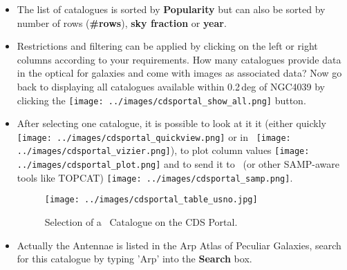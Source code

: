 \documentclass [a4paper, 12pt]{article}
\begin{document}
\begin{itemize}
\item The list of catalogues is sorted by \textbf{Popularity} but can
also be sorted by number of rows (\textbf{\#rows}), \textbf{sky
fraction} or \textbf{year}.
\item Restrictions and filtering can be applied by clicking
on the left or right columns according to your requirements. How many catalogues
provide data in the optical for galaxies and come with images as associated data?
Now go back to displaying all catalogues available within 0.2\,deg of NGC4039 by
clicking the
\texttt{[image: ../images/cdsportal\_show\_all.png]} button.
\item After selecting one catalogue, it is possible to look at it it (either
quickly \texttt{[image: ../images/cdsportal\_quickview.png]}
or in \vizier\ \texttt{[image: ../images/cdsportal\_vizier.png]}),
to plot column values \texttt{[image: ../images/cdsportal\_plot.png]}
and to send it to \aladin\ (or other SAMP-aware tools like TOPCAT)
\texttt{[image: ../images/cdsportal\_samp.png]}.
\begin{figure}[H]
\center
\texttt{[image: ../images/cdsportal\_table\_usno.jpg]}
\caption{Selection of a \vizier\ Catalogue on the CDS Portal.}
\label{fig:cdsportal5}
\end{figure}
\item Actually the Antennae is listed in the Arp Atlas of Peculiar
Galaxies, search for this catalogue by typing 'Arp' into the \textbf{Search} box.


\end{itemize}
\end{document}
